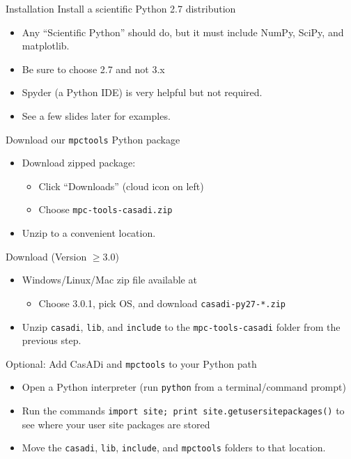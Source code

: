\documentclass[xcolor=dvipsnames]{beamer}
\begin{document}
%
\begin{frame}[allowframebreaks]{Installation}
    Install a scientific Python 2.7 distribution
    \begin{itemize}
        \item Any ``Scientific Python'' should do, but it must include NumPy, SciPy, and matplotlib.
        \item Be sure to choose 2.7 and not 3.x
        \item Spyder (a Python IDE) is very helpful but not required.
        \item See a few slides later for examples.
    \end{itemize}
    
    \medskip
    
    Download our \texttt{mpctools} Python package
    \begin{itemize}
        \item Download zipped package: 
        \begin{itemize}
            \item Click ``Downloads'' (cloud icon on left)
            \item Choose \texttt{mpc-tools-casadi.zip}
        \end{itemize}
        \item Unzip to a convenient location.
    \end{itemize}
    
    \framebreak
    
    Download \casadi{} (Version $\ge$3.0)
    \begin{itemize}
        \item Windows/Linux/Mac zip file available at 
            \begin{itemize}
                \item Choose 3.0.1, pick OS, and download \texttt{casadi-py27-*.zip}
            \end{itemize}
        \item Unzip \texttt{casadi}, \texttt{lib}, and \texttt{include} to the \texttt{mpc-tools-casadi} folder from the previous step.
    \end{itemize}
    
    \medskip
    
    Optional: Add CasADi and \texttt{mpctools} to your Python path
    \begin{itemize}
        \item Open a Python interpreter (run \lstinline[style=shell]!python! from a terminal/command prompt)
        \item Run the commands \lstinline[style=python]!import site; print site.getusersitepackages()! to see where your user site packages are stored
        \item Move the \texttt{casadi}, \texttt{lib}, \texttt{include}, and \texttt{mpctools} folders to that location.
    \end{itemize}
\end{frame}
\end{document}
